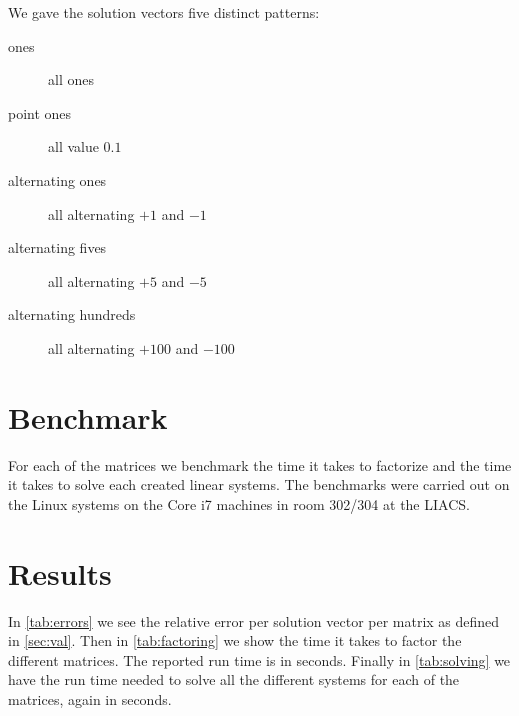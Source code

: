 \documentclass[10pt]{article}
\begin{document}
We gave the solution vectors five distinct patterns:

\begin{description}
    \item [ones] all ones
    \item [point ones] all value $0.1$
    \item [alternating ones] all alternating $+1$ and $-1$
    \item [alternating fives] all alternating $+5$ and $-5$
    \item [alternating hundreds] all alternating $+100$ and $-100$
\end{description}

\section{Benchmark}
For each of the matrices we benchmark the time it takes to factorize and the time it takes to solve each created linear systems. The benchmarks were carried out on the Linux systems on the Core i7 machines in room 302/304 at the LIACS.

\section{Results}
In \autoref{tab:errors} we see the relative error per solution vector per matrix as defined in \autoref{sec:val}. Then in \autoref{tab:factoring} we show the time it takes to factor the different matrices. The reported run time is in seconds. Finally in \autoref{tab:solving} we have the run time needed to solve all the different systems for each of the matrices, again in seconds.
\end{document}
